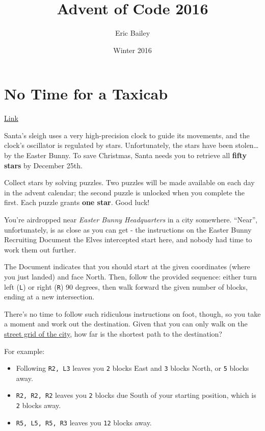\documentclass[b5paper,twoside]{amsbook}
\title{Advent of Code 2016}
\author{Eric Bailey}
\date{Winter 2016}
\providecommand{\tightlist}{%
  \setlength{\itemsep}{0pt}\setlength{\parskip}{0pt}}
\begin{document}
\maketitle

\frontmatter

{
\setcounter{tocdepth}{2}
\tableofcontents
}
\mainmatter

\chapter{No Time for a Taxicab}\label{no-time-for-a-taxicab}

\href{https://adventofcode.com/2016/day/1}{Link}

Santa's sleigh uses a very high-precision clock to guide its movements,
and the clock's oscillator is regulated by stars. Unfortunately, the
stars have been stolen\ldots{} by the Easter Bunny. To save Christmas,
Santa needs you to retrieve all \textbf{fifty stars} by December 25th.

Collect stars by solving puzzles. Two puzzles will be made available on
each day in the advent calendar; the second puzzle is unlocked when you
complete the first. Each puzzle grants \textbf{one star}. Good luck!

You're airdropped near \emph{Easter Bunny Headquarters} in a city
somewhere. ``Near'', unfortunately, is as close as you can get - the
instructions on the Easter Bunny Recruiting Document the Elves
intercepted start here, and nobody had time to work them out further.

The Document indicates that you should start at the given coordinates
(where you just landed) and face North. Then, follow the provided
sequence: either turn left (\texttt{L}) or right
(\texttt{R}) 90 degrees, then walk forward the given number
of blocks, ending at a new intersection.

There's no time to follow such ridiculous instructions on foot, though,
so you take a moment and work out the destination. Given that you can
only walk on the
\href{https://en.wikipedia.org/wiki/Taxicab_geometry}{street grid of the
city}, how far is the shortest path to the destination?

For example:

\begin{itemize}
\tightlist
\item
  Following \texttt{R2, L3} leaves you
  \texttt{2} blocks East and \texttt{3} blocks
  North, or \texttt{5} blocks away.
\item
  \texttt{R2, R2, R2} leaves you \texttt{2}
  blocks due South of your starting position, which is
  \texttt{2} blocks away.
\item
  \texttt{R5, L5, R5, R3} leaves you
  \texttt{12} blocks away.
\end{itemize}
\end{document}
